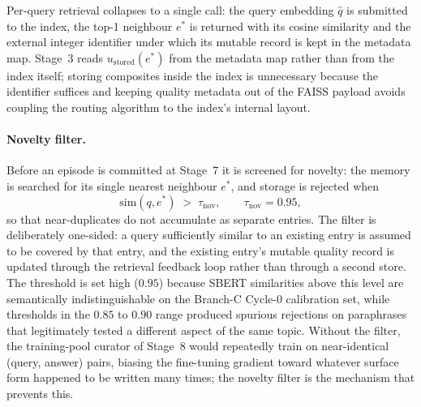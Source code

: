 Per-query retrieval collapses to a single call: the query embedding $\hat{q}$ is submitted to the index, the top-1 neighbour $e^{*}$ is returned with its cosine similarity and the external integer identifier under which its mutable record is kept in the metadata map. Stage~3 reads $u_{\text{stored}}(e^{*})$ from the metadata map rather than from the index itself; storing composites inside the index is unnecessary because the identifier suffices and keeping quality metadata out of the FAISS payload avoids coupling the routing algorithm to the index's internal layout.

\paragraph{Novelty filter.}
Before an episode is committed at Stage~7 it is screened for novelty: the memory is searched for its single nearest neighbour $e^{*}$, and storage is rejected when
\begin{equation}
\mathrm{sim}(q, e^{*}) \;>\; \tau_{\text{nov}}, \qquad \tau_{\text{nov}} = 0.95,
\label{eq:novelty}
\end{equation}
so that near-duplicates do not accumulate as separate entries. The filter is deliberately one-sided: a query sufficiently similar to an existing entry is assumed to be covered by that entry, and the existing entry's mutable quality record is updated through the retrieval feedback loop rather than through a second store. The threshold is set high ($0.95$) because SBERT similarities above this level are semantically indistinguishable on the Branch-C Cycle-0 calibration set, while thresholds in the $0.85$ to $0.90$ range produced spurious rejections on paraphrases that legitimately tested a different aspect of the same topic. Without the filter, the training-pool curator of Stage~8 would repeatedly train on near-identical (query, answer) pairs, biasing the fine-tuning gradient toward whatever surface form happened to be written many times; the novelty filter is the mechanism that prevents this.

